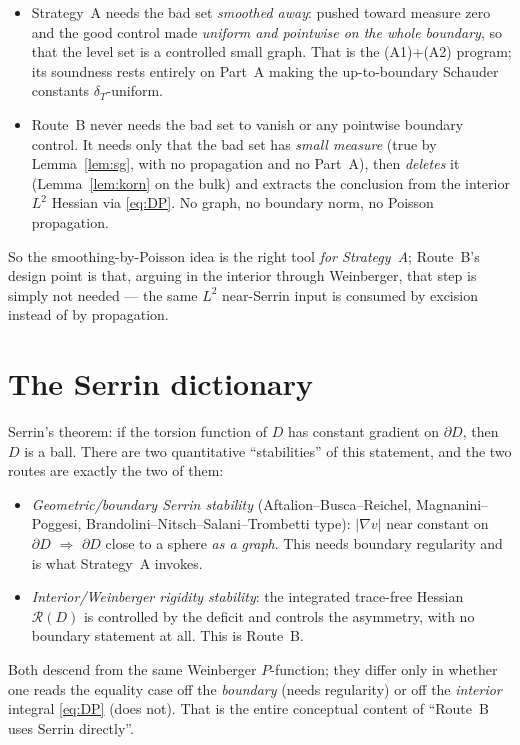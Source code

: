 \documentclass[11pt]{amsart}
\theoremstyle{definition}
\theoremstyle{remark}
\newcommand{\dT}{\delta_T}
\newcommand{\R}{\mathcal R}
\begin{document}
\begin{itemize}
\item Strategy~A needs the bad set \emph{smoothed away}: pushed toward
measure zero and the good control made \emph{uniform and pointwise on
the whole boundary}, so that the level set is a controlled small graph.
That is the (A1)+(A2) program; its soundness rests entirely on Part~A
making the up-to-boundary Schauder constants $\dT$-uniform.
\item Route~B never needs the bad set to vanish or any pointwise
boundary control. It needs only that the bad set has \emph{small
measure} (true by Lemma~\ref{lem:sg}, with no propagation and no
Part~A), then \emph{deletes} it (Lemma~\ref{lem:korn} on the bulk) and
extracts the conclusion from the interior $L^2$ Hessian via
\eqref{eq:DP}. No graph, no boundary norm, no Poisson propagation.
\end{itemize}
So the smoothing-by-Poisson idea is the right tool \emph{for
Strategy~A}; Route~B's design point is that, arguing in the interior
through Weinberger, that step is simply not needed --- the same $L^2$
near-Serrin input is consumed by excision instead of by propagation.

\section{The Serrin dictionary}

Serrin's theorem: if the torsion function of $D$ has constant gradient
on $\partial D$, then $D$ is a ball. There are two quantitative
``stabilities'' of this statement, and the two routes are exactly the
two of them:
\begin{itemize}
\item \emph{Geometric/boundary Serrin stability} (Aftalion--Busca--Reichel,
Magnanini--Poggesi, Brandolini--Nitsch--Salani--Trombetti type):
$|\nabla v|$ near constant on $\partial D$ $\Rightarrow$ $\partial D$
close to a sphere \emph{as a graph}. This needs boundary regularity and
is what Strategy~A invokes.
\item \emph{Interior/Weinberger rigidity stability}: the integrated
trace-free Hessian $\R(D)$ is controlled by the deficit and controls
the asymmetry, with no boundary statement at all. This is Route~B.
\end{itemize}
Both descend from the same Weinberger $P$-function; they differ only in
whether one reads the equality case off the \emph{boundary} (needs
regularity) or off the \emph{interior} integral \eqref{eq:DP} (does
not). That is the entire conceptual content of ``Route~B uses Serrin
directly''.
\end{document}
